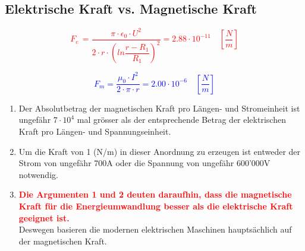 \subsection{Elektrische Kraft vs. Magnetische Kraft}
\begin{minipage}{0.5\textwidth}
	\centering
    \textcolor{red}{\begin{equation*}F_e\, = \dfrac{\pi\cdot\epsilon_0\cdot U^2}{2\cdot r\cdot\left(ln\dfrac{r-R_1}{R_1}\right)^2} = 2.88\cdot 10^{-11} \quad \left[\dfrac{N}{m}\right]\end{equation*}}
    \end{minipage}
    \begin{minipage}{0.5\textwidth}
    	\centering
    \textcolor{blue}{\begin{equation*}F_m = \dfrac{\mu_0\cdot I^2}{2\cdot\pi\cdot r} = 2.00 \cdot 10^{-6} \quad\left[\dfrac{N}{m}\right]\end{equation*}}
\end{minipage}
\begin{enumerate}
	\item Der Absolutbetrag der magnetischen Kraft pro Längen- und Stromeinheit ist
	ungefähr $7\cdot10^4$ mal grösser als der entsprechende Betrag der elektrischen Kraft
	pro Längen- und Spannungseinheit.
	\item Um die Kraft von 1 (N/m) in dieser Anordnung zu erzeugen ist entweder der
	Strom von ungefähr 700A oder die Spannung von ungefähr 600’000V notwendig.
	\item \textcolor{red}{\textbf{Die Argumenten 1 und 2 deuten daraufhin, dass die magnetische Kraft für die Energieumwandlung besser als die elektrische Kraft geeignet ist.}}\\[0.2cm]
	Deswegen basieren die modernen elektrischen Maschinen hauptsächlich auf der magnetischen Kraft.
\end{enumerate}
\clearpage
\newpage